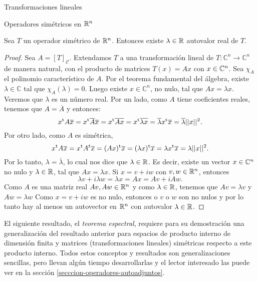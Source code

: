 \begin{chapter}{Transformaciones lineales}
\begin{section}{Operadores simétricos en $\mathbb R^n$}
\begin{obs}
    \end{obs}
    
    \begin{teorema}\label{th-existe-autovalor-simetrica}
        Sea $T$ un operador simétrico de $\mathbb R^n$. Entonces existe $\lambda \in \mathbb R$ autovalor real de $T$.   
    \end{teorema}
    \begin{proof} Sea $A = [T]_{\mathcal{C}}$. Extendamos $T$  a una transformación lineal de $T: \mathbb{C}^n \to \mathbb{C}^n$ de manera natural, con el producto de matrices $T(x) = Ax$ con $x \in \mathbb C^n$. Sea $\chi_A$ el polinomio característico de $A$. Por el teorema fundamental  del álgebra, existe $\lambda \in \mathbb{C}$ tal que $\chi_A(\lambda)=0$. Luego existe $x \in \mathbb{C}^n$, no nulo,  tal que $Ax = \lambda x$.  Veremos que $\lambda$ es un número real. Por un lado, como $A$ tiene coeficientes reales, tenemos que $A = \overline{A}$ y entonces:
        \begin{equation*}
        x^{\operatorname{t}} A\overline{x} = x^{\operatorname{t}} \overline{A}\overline{x} =x^{\operatorname{t}}\overline{Ax} =x^{\operatorname{t}}\overline{\lambda x} = \overline{\lambda} x^{\operatorname{t}}\overline{x} = \overline{\lambda} ||x||^2 .
        \end{equation*}
    Por otro lado,  como $A$  es simétrica,
        \begin{equation*}
        x^{\operatorname{t}} A\overline{x} = x^{\operatorname{t}} A^t\overline{x}= (A x)^{\operatorname{t}}\overline{x} = (\lambda x)^{\operatorname{t}}\overline{x} = \lambda x^{\operatorname{t}}\overline{x} = \lambda ||x||^2. 
        \end{equation*}
    Por lo tanto, $\lambda = \overline{\lambda}$, lo cual nos dice que ${\lambda} \in \mathbb R$.  Es decir, existe un vector $x \in \mathbb C^n$ no nulo y $\lambda \in \mathbb R$, tal que $Ax=\lambda x$. Si  $x = v +iw$ con $v,w \in \mathbb R^n$, entonces 
        \begin{equation*}
        \lambda v + i \lambda w = \lambda x = Ax = Av + i Aw.
        \end{equation*}
    Como $A$ es una matriz real $Av,Aw \in \mathbb R^n$ y como $\lambda \in \mathbb R$, tenemos que $Av = \lambda v$ y $Aw = \lambda w$ Como $x = v + iw$ es no nulo,  entonces o $v$ o $w$ son no nulos y por  lo tanto  hay al menos un autovector en $\mathbb R^n$ con autovalor $\lambda \in \mathbb R$. 
    \end{proof}
    
 
    
    El siguiente resultado, el \textit{teorema espectral}, requiere para su demostración una generalización del resultado anterior para espacios de producto interno  de dimensión finita y matrices (transformaciones lineales)  simétricas respecto a este producto interno. Todos estos conceptos y resultados son generalizaciones sencillas, pero llevan algún tiempo desarrollarlas y el lector interesado las puede ver en la sección \ref{secccion-operadores-autoadjuntos}. 
        

\end{section}
\end{chapter}
